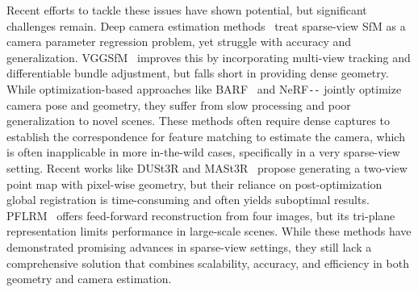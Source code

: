 Recent efforts to tackle these issues have shown potential, but significant challenges remain.
Deep camera estimation methods~\citep{sinha2023sparsepose, wang2023posediffusion, lin2023relposepp, zhang2024cameras} treat sparse-view SfM as a camera parameter regression problem, yet struggle with accuracy and generalization. VGGSfM~\citep{wang2024vggsfm} improves this by incorporating multi-view tracking and differentiable bundle adjustment, but falls short in providing dense geometry.
While optimization-based approaches like BARF~\citep{lin2021barf} and NeRF\texttt{-}\texttt{-}\citep{wang2021nerf} jointly optimize camera pose and geometry, they suffer from slow processing and poor generalization to novel scenes. 
These methods often require dense captures to establish the correspondence for feature matching to estimate the camera, which is often inapplicable in more in-the-wild cases, specifically in a very sparse-view setting.
Recent works like DUSt3R\citep{wang2024dust3r} and MASt3R~\citep{} propose generating a two-view point map with pixel-wise geometry, but their reliance on post-optimization global registration is time-consuming and often yields suboptimal results. PFLRM~\citep{wang2023pf} offers feed-forward reconstruction from four images, but its tri-plane representation limits performance in large-scale scenes.
 While these methods have demonstrated promising advances in sparse-view settings, they still lack a comprehensive solution that combines scalability, accuracy, and efficiency in both geometry and camera estimation.
